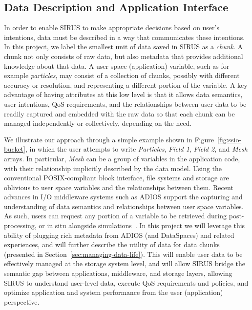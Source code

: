 \subsection{Data Description and Application Interface}
\label{sec:data-description}
In order to enable SIRUS to make appropriate decisions based on user's intentions, data must be
described in a way that communicates these intentions.
 In this project, we label the smallest unit of data
saved in  SIRUS as a \textit{chunk}.  A chunk not only consists of 
raw data, but also metadata that provides additional
knowledge about that data.
A user space (application) variable, such as for example \textit{particles}, may
consist of a collection of chunks, possibly with different accuracy or
resolution, and representing a different portion of the variable.
A key advantage of having attributes at this low level is that it allows data
semantics, user intentions, QoS requirements, and the relationships between user
data to be readily captured and embedded with the raw data so that each chunk
can be managed independently or collectively, depending on the need.

  We illustrate our approach through a simple example shown in Figure~\ref{fig:ssio-bucket},
  in which the user attempts to write \textit{Particles}, \textit{Field 1},
  \textit{Field 2}, and \textit{Mesh} arrays. In particular, \textit{Mesh} can be a group
  of variables in the application code, with their relationship implicitly described
  by the data model. Using the conventional POSIX-compliant block interface, file
  systems and storage are oblivious to user space variables and the relationships between
  them. Recent advances in I/O middleware systems such as ADIOS \cite{liu_helloadios}
  support the capturing and understanding of data semantics and relationships between  
  user space variables. As such, users can request any portion of a variable to be retrieved
  during post-processing, or in situ alongside simulations~\cite{docan2012dataspaces}. 
  In this project we will leverage this ability of plugging rich metadata from ADIOS (and 
  DataSpaces) and related experiences, and will further describe the utility of data for data 
  chunks (presented in Section~\ref{sec:managing-data-life}). This will enable user data to 
  be effectively managed at the storage system level, and will allow SIRUS
%  
%   
bridge the semantic gap between applications, middleware, and storage layers, allowing SIRUS to understand user-level data, execute QoS requirements and policies, and optimize 
application and system performance from the user (application) perspective.


